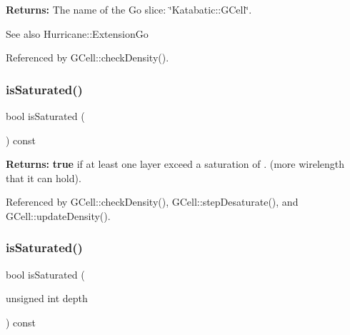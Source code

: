 {\bfseries Returns\+:} The name of the Go slice\+: {\ttfamily \char`\"{}\+Katabatic\+::\+G\+Cell\char`\"{}}.

\begin{DoxySeeAlso}{See also}
Hurricane\+::\+Extension\+Go 
\end{DoxySeeAlso}


Referenced by G\+Cell\+::check\+Density().

\mbox{\label{classKatabatic_1_1GCell_a9f274f17cf9166e997d306b120618fdf}} 
\subsubsection{\texorpdfstring{is\+Saturated()}{isSaturated()}\hspace{0.1cm}{\footnotesize\ttfamily [1/2]}}
{\footnotesize\ttfamily bool is\+Saturated (\begin{DoxyParamCaption}{ }\end{DoxyParamCaption}) const\hspace{0.3cm}{\ttfamily [inline]}}

{\bfseries Returns\+:} {\bfseries true} if at least one layer exceed a saturation of {.} (more wirelength that it can hold). 

Referenced by G\+Cell\+::check\+Density(), G\+Cell\+::step\+Desaturate(), and G\+Cell\+::update\+Density().

\mbox{\label{classKatabatic_1_1GCell_a49b7bd2f05abd94436177558fd0f97d8}} 
\subsubsection{\texorpdfstring{is\+Saturated()}{isSaturated()}\hspace{0.1cm}{\footnotesize\ttfamily [2/2]}}
{\footnotesize\ttfamily bool is\+Saturated (\begin{DoxyParamCaption}\item[{unsigned int}]{depth }\end{DoxyParamCaption}) const}

